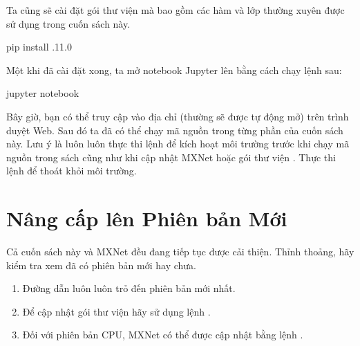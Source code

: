 \documentclass[letterpaper,11pt,english]{sphinxmanual}
\begin{document}
Ta cũng sẽ cài đặt gói thư viện  mà bao gồm các hàm và lớp thường
xuyên được sử dụng trong cuốn sách này.

\begin{sphinxVerbatim}[commandchars=\\\{\}]
pip install .11.0
\end{sphinxVerbatim}



Một khi đã cài đặt xong, ta mở notebook Jupyter lên bằng cách chạy lệnh
sau:

\begin{sphinxVerbatim}[commandchars=\\\{\}]
jupyter notebook
\end{sphinxVerbatim}



Bây giờ, bạn có thể truy cập vào địa chỉ  (thường
sẽ được tự động mở) trên trình duyệt Web. Sau đó ta đã có thể chạy mã
nguồn trong từng phần của cuốn sách này. Lưu ý là luôn luôn thực thi
lệnh  để kích hoạt môi trường trước khi chạy mã
nguồn trong sách cũng như khi cập nhật MXNet hoặc gói thư viện .
Thực thi lệnh  để thoát khỏi môi trường.




\section{Nâng cấp lên Phiên bản Mới}
\label{\detokenize{chapter_install/index_vn:nang-cap-len-phien-ban-moi}}


Cả cuốn sách này và MXNet đều đang tiếp tục được cải thiện. Thỉnh
thoảng, hãy kiểm tra xem đã có phiên bản mới hay chưa.


\begin{enumerate}
%
\item {} 
Đường dẫn  luôn luôn trỏ đến phiên bản mới
nhất.

\item {} 
Để cập nhật gói thư viện  hãy sử dụng lệnh
.

\item {} 
Đối với phiên bản CPU, MXNet có thể được cập nhật bằng lệnh
.

\end{enumerate}
\end{document}
